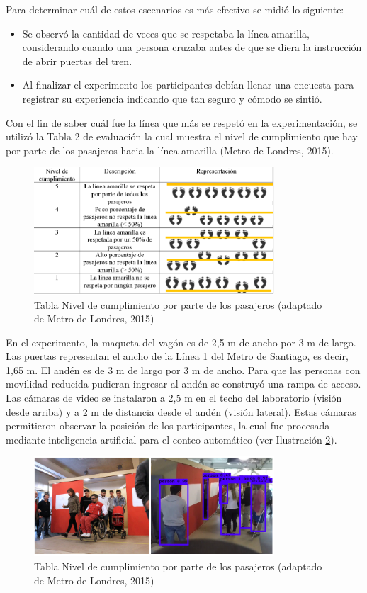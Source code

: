 Para determinar cuál de estos escenarios es más efectivo se midió lo siguiente:

\begin{itemize}
  \item Se observó la cantidad de veces que se respetaba la línea amarilla, considerando cuando una persona cruzaba antes de que se diera la instrucción de abrir puertas del tren.
  \item Al finalizar el experimento los participantes debían llenar una encuesta para registrar su experiencia indicando que tan seguro y cómodo se sintió. 
  
\end{itemize}


Con el fin de saber cuál fue la línea que más se respetó en la experimentación, se utilizó la Tabla 2 de evaluación la cual muestra el nivel de cumplimiento que hay por parte de los pasajeros hacia la línea amarilla (Metro de Londres, 2015).

\begin{figure}
  \centering
  \includegraphics[width=0.8\textwidth]{imagenes/ilustracion_3.png}
  \caption{Tabla Nivel de cumplimiento por parte de los pasajeros (adaptado de Metro de Londres, 2015)
  }\label{fig3}
\end{figure}


En el experimento, la maqueta del vagón es de 2,5 m de ancho por 3 m de largo. Las puertas representan el ancho de la Línea 1 del Metro de Santiago, es decir, 1,65 m. El andén es de 3 m de largo por 3 m de ancho. Para que las personas con movilidad reducida pudieran ingresar al andén se construyó una rampa de acceso. Las cámaras de video se instalaron a 2,5 m en el techo del laboratorio (visión desde arriba) y a 2 m de distancia desde el andén (visión lateral). Estas cámaras permitieron observar la posición de los participantes, la cual fue procesada mediante inteligencia artificial para el conteo automático (ver Ilustración \ref{fig4}).

\begin{figure}
  \centering
  \includegraphics[width=0.8\textwidth]{imagenes/ilustracion_4.png}
  \caption{Tabla Nivel de cumplimiento por parte de los pasajeros (adaptado de Metro de Londres, 2015)
  }\label{fig4}
\end{figure}
